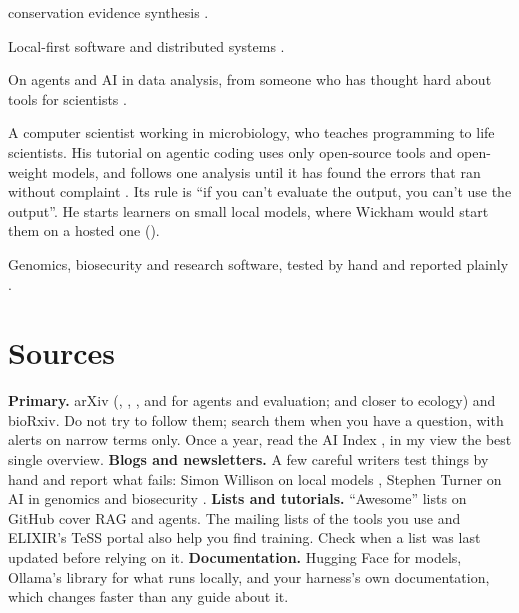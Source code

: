\begin{description}
    conservation evidence synthesis \parencite{bergertal2024evidence}.
  \item[Martin Kleppmann (Cambridge)] Local-first software and distributed
    systems \parencite{kleppmann2019localfirst}.
  \item[Hadley Wickham (Posit)] On agents and AI in data analysis, from someone
    who has thought hard about tools for scientists \parencite{wickham2026nobs}.
  \item[A. Murat Eren (Meren; University of Oldenburg)] A computer scientist
    working in microbiology, who teaches programming to life scientists. His
    tutorial on agentic coding uses only open-source tools and open-weight
    models, and follows one analysis until it has found the errors that ran
    without complaint \parencite{eren2026agenticcoding}. Its rule is ``if you
    can't evaluate the output, you can't use the output''. He starts learners
    on small local models, where Wickham would start them on a hosted one
    ().
  \item[Stephen Turner (University of Virginia)] Genomics, biosecurity and
    research software, tested by hand and reported plainly
    \parencite{turner2026slop,turner2026biosecuritybenchmarks,nagraj2026sniff}.
\end{description}

\section{Sources}

\textbf{Primary.} arXiv (, , ,
 and  for agents and evaluation;  and
 closer to ecology) and bioRxiv.
Do not try to follow them; search them when you have a question, with alerts on
narrow terms only. Once a year, read the AI Index \parencite{aiindex2026}, in my
view the best single overview. \textbf{Blogs and newsletters.} A few careful
writers test things by hand and report what fails: Simon Willison on local models
\parencite{willison2026qwen38}, Stephen Turner on AI in genomics and biosecurity
\parencite{turner2026slop}. \textbf{Lists and tutorials.} ``Awesome'' lists on
GitHub cover RAG and agents. The mailing lists of the tools you use and
ELIXIR's TeSS portal also help you find training. Check when a list was last
updated before relying on it. \textbf{Documentation.} Hugging Face for models, Ollama's
library for what runs locally, and your harness's own documentation, which
changes faster than any guide about it.

